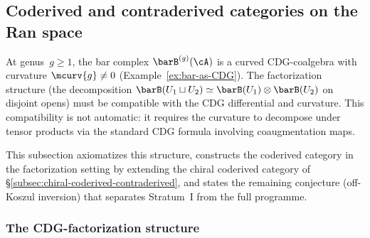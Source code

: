 
\subsection{Coderived and contraderived categories on the Ran space}
\label{subsec:coderived-ran-formalism}

At genus~$g \geq 1$, the bar complex $\barB^{(g)}(\cA)$ is a
curved CDG-coalgebra with curvature $\mcurv{g} \neq 0$
(Example~\ref{ex:bar-as-CDG}).  The factorization structure (the
decomposition
$\barB(U_1 \sqcup U_2) \simeq \barB(U_1) \otimes \barB(U_2)$
on disjoint opens) must be compatible with the CDG differential
and curvature.  This compatibility is not automatic: it requires
the curvature to decompose under tensor products via the standard
CDG formula involving coaugmentation maps.

This subsection axiomatizes this structure, constructs the coderived
category in the factorization setting by extending the chiral
coderived category of
\S\ref{subsec:chiral-coderived-contraderived}, and states
the remaining conjecture (off-Koszul inversion) that separates
Stratum~I from the full programme.

\subsubsection*{The CDG-factorization structure}
\label{subsec:CDG-factorization}

